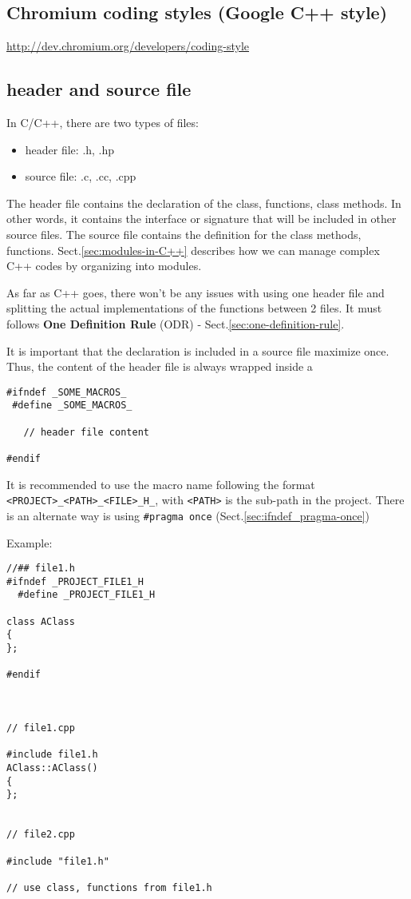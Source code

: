 \subsection{Chromium coding styles (Google C++ style)}

\url{http://dev.chromium.org/developers/coding-style}


\subsection{header and source file}
\label{sec:header-and-source-files-C++}

In C/C++, there are two types of files: 
\begin{itemize}
  \item header file: .h, .hp
  \item source file: .c, .cc, .cpp
\end{itemize}

The header file contains the declaration of the class, functions, class methods.
In other words, it contains the interface or signature that will be included in
other source files. The source file contains the definition for the class
methods, functions. Sect.\ref{sec:modules-in-C++} describes how we can manage
complex C++ codes by organizing into modules.


As far as C++ goes, there won't be any issues with using one header file and
splitting the actual implementations of the functions between 2 files. It must follows 
{\bf One Definition Rule} (ODR) - Sect.\ref{sec:one-definition-rule}.


It is important that the declaration is included in a source
file maximize once. Thus, the content of the header file is always wrapped
inside a 
\begin{verbatim}
#ifndef _SOME_MACROS_
 #define _SOME_MACROS_
 
   // header file content
   
#endif
\end{verbatim}
It is recommended to use the macro name following the format
\verb!<PROJECT>_<PATH>_<FILE>_H_!, with \verb!<PATH>! is the sub-path in the
project. There is an alternate way is using \verb!#pragma once!
(Sect.\ref{sec:ifndef_pragma-once})

Example:
\begin{verbatim}
//## file1.h
#ifndef _PROJECT_FILE1_H
  #define _PROJECT_FILE1_H

class AClass
{
};

#endif



// file1.cpp

#include file1.h
AClass::AClass() 
{
};


// file2.cpp

#include "file1.h"

// use class, functions from file1.h
\end{verbatim}


